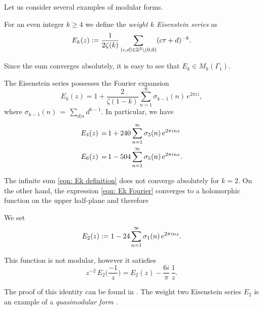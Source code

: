 Let us consider several examples of modular forms.
\begin{definition}\label{def: Ek definition}%
For an even integer $k\geq 4$ we define the \emph{weight $k$ Eisenstein series} as
\begin{equation}\label{eqn: Ek definition}E_k(z):=\frac{1}{2\zeta(k)}\sum_{(c,d)\in\mathbb{Z}^2\backslash(0,0)}(c\tau+d)^{-k}.\end{equation}
\end{definition}
Since the sum converges absolutely, it is easy to see that $E_k\in M_k(\Gamma_1)$.
\begin{lemma}\label{lemma: Ek Fourier}
The Eisenstein series possesses the Fourier expansion
\begin{equation}\label{eqn: Ek Fourier}E_k(z)=1+\frac{2}{\zeta(1-k)}\sum_{n=1}^\infty \sigma_{k-1}(n)\,e^{2\pi i z}, \end{equation}
where $\sigma_{k-1}(n)\,=\,\sum_{d|n} d^{k-1}$. In particular, we have
\begin{align}
  E_4(z)\,=\,& 1+240\sum_{n=1}^\infty \sigma_3(n)\,e^{2\pi i n z} \notag \\
  E_6(z)\,=\,& 1-504\sum_{n=1}^\infty \sigma_5(n)\,e^{2\pi i n z}. \notag
\end{align}
\end{lemma}
The infinite sum \eqref{eqn: Ek definition} does not converge absolutely for $k=2$. On the other hand, the expression \eqref{eqn: Ek Fourier} converges to a holomorphic function on the upper half-plane and therefore
\begin{definition} \label{def: E2 def} %
We set
\begin{equation}E_2(z):= 1-24\sum_{n=1}^\infty \sigma_1(n)\,e^{2\pi i n z}.\notag\end{equation}
\end{definition}
\begin{lemma}
\label{lemma: E2 transform}


This function is not modular, however it satisfies
\begin{equation}\label{eqn: E2 transform}z^{-2}\,E_2\Big(\frac{-1}{z}\Big)=E_2(z) -\frac{6i}{\pi}\, \frac{1}{z}.\end{equation}
\end{lemma}
The proof of this identity can be found in \cite[Section~2.3]{1-2-3}.
The weight two Eisenstein series $E_2$ is an example of a \emph{quasimodular form} \cite[Section~5.1]{1-2-3}.


